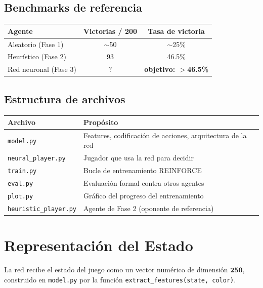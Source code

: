 \documentclass[11pt, a4paper]{article}
\begin{document}
\subsection{Benchmarks de referencia}

\begin{center}
\begin{tabular}{lcc}
  \toprule
  \textbf{Agente} & \textbf{Victorias / 200} & \textbf{Tasa de victoria} \\
  \midrule
  Aleatorio (Fase 1)   & $\sim$50 & $\sim$25\% \\
  Heurístico (Fase 2)  & 93       & 46.5\%     \\
  Red neuronal (Fase 3)& ?        & \textbf{objetivo: $>$46.5\%} \\
  \bottomrule
\end{tabular}
\end{center}

\subsection{Estructura de archivos}

\begin{center}
\begin{tabular}{ll}
  \toprule
  \textbf{Archivo} & \textbf{Propósito} \\
  \midrule
  \texttt{model.py}           & Features, codificación de acciones, arquitectura de la red \\
  \texttt{neural\_player.py}  & Jugador que usa la red para decidir \\
  \texttt{train.py}           & Bucle de entrenamiento REINFORCE \\
  \texttt{eval.py}            & Evaluación formal contra otros agentes \\
  \texttt{plot.py}            & Gráfico del progreso del entrenamiento \\
  \texttt{heuristic\_player.py} & Agente de Fase 2 (oponente de referencia) \\
  \bottomrule
\end{tabular}
\end{center}


\section{Representación del Estado}

La red recibe el estado del juego como un vector numérico de dimensión $\mathbf{250}$,
construido en \texttt{model.py} por la función \texttt{extract\_features(state, color)}.
\end{document}
